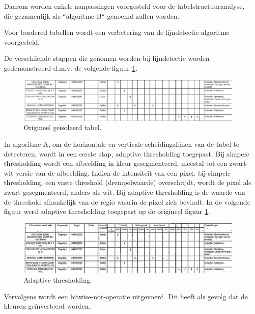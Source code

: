 Daarom worden enkele aanpassingen voorgesteld voor de tabelstructuuranalyse, die gezamenlijk als ``algoritme B`` genoemd zullen worden.

Voor bordered tabellen wordt een verbetering van de lijndetectie-algoritme voorgesteld.

De verschilende stappen die genomen worden bij lijndetectie worden gedemonstreerd d.m.v. de volgende figuur \ref{fig:lijn-detectie-origineel}.

\begin{figure}[H]
    \centering
    \includegraphics[width=1\textwidth]{img/lijn_detectie_origineel.png}
    \caption{Origineel geïsoleerd tabel.}
    \label{fig:lijn-detectie-origineel}
\end{figure}

In algoritme A, om de horizontale en verticale scheidingslijnen van de tabel te detecteren, wordt in een eerste stap, adaptive thresholding toegepast. Bij simpele thresholding wordt een afbeelding in kleur gesegmenteerd, meestal tot een zwart-wit-versie van de afbeelding. Indien de intensiteit van een pixel, bij simpele thresholding, een vaste threshold (drempelwaarde) overschrijdt, wordt de pixel als zwart gesegmenteerd, anders als wit. Bij adaptive thresholding is de waarde van de threshold afhankelijk van de regio waarin de pixel zich bevindt. In de volgende figuur werd adaptive thresholding toegepast op de origineel figuur \ref{fig:lijn-detectie-origineel}.

\begin{figure}[H]
    \centering
    \includegraphics[width=1\textwidth]{img/line_detection_a_1_adaptive_threshold_on_image.png}
    \caption{Adaptive thresholding.}
\end{figure}

Vervolgens wordt een bitwise-not-operatie uitgevoerd. Dit heeft als gevolg dat de kleuren geïnverteerd worden.

